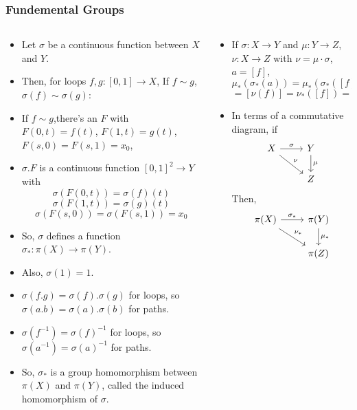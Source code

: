 \documentclass[8pt]{beamer}
\begin{document}
  \begin{frame}
    \frametitle{Fundemental Groups}
    \begin{columns}
      \begin{column}[T]{0.5\textwidth}
        \begin{itemize}
          \item<1-> Let $\sigma$ be a continuous function between $X$ and $Y$.
          \item<2-> Then, for loops $f,g : [0,1] \rightarrow X$,
            If $f \sim g$, $\sigma(f) \sim \sigma(g)$:
          \item<3-> If $f \sim g$,there's an $F$ with $F(0,t) = f(t)$, $F(1,t) =
            g(t)$, $F(s,0) = F(s,1) = x_0$,
          \item<4-> $\sigma . F$ is a continuous function $[0,1]^2 \rightarrow Y$
            with \[\sigma(F(0,t)) = \sigma(f)(t)\]
            \[\sigma(F(1,t)) = \sigma(g)(t)\]
            \[\sigma(F(s,0)) = \sigma(F(s,1)) = x_0\]
          \item<5-> So, $\sigma$ defines a function $\sigma_* : \pi(X) \rightarrow
            \pi(Y)$.
          \item<6-> Also, $\sigma(1) = 1$.
          
          \item<7-> $\sigma(f.g) = \sigma(f). \sigma(g)$ for loops, so
            $\sigma(a.b) = \sigma(a).\sigma(b)$ for paths.
          \item<7-> $\sigma(f^{-1}) = \sigma(f)^{-1}$ for loops, so
            $\sigma(a^{-1}) = \sigma(a)^{-1}$ for paths.
          \item<8-> So, $\sigma_*$ is a group homomorphism between $\pi(X)$ and
            $\pi(Y)$, called the induced homomorphism of $\sigma$.
        \end{itemize}

      \end{column}
      \begin{column}[T]{0.5\textwidth}
        \begin{itemize}
          \item<9-> If $\sigma : X \rightarrow Y$ and $\mu : Y \rightarrow Z$,
            $\nu : X \rightarrow Z$ with $\nu = \mu \cdot \sigma$, $a = [f]$,
            \[\mu_*(\sigma_*(a)) = \mu_*(\sigma_*([f])) = \mu_*([\sigma(f)])
                  = [\mu(\sigma(f))] \]\[= [\nu(f)] = \nu_*([f]) = \nu_*(a)\]
          \item<10-> In terms of a commutative diagram, if
                \[\begin{tikzcd}[ampersand replacement=\&]
                  X \ar[rd, "\nu"]
                  \ar[r,"\sigma"] \& Y \ar[d, "\mu"]
                  \\ \& Z
                  \end{tikzcd}\]
                Then,
                \[\begin{tikzcd}[ampersand replacement=\&]
                  \pi(X) \ar[rd, "\nu_*"]
                  \ar[r,"\sigma_*"] \& \pi(Y) \ar[d, "\mu_*"]
                  \\ \& \pi(Z)
                  \end{tikzcd}\]



\end{itemize}
\end{column}
\end{columns}
\end{frame}
\end{document}
